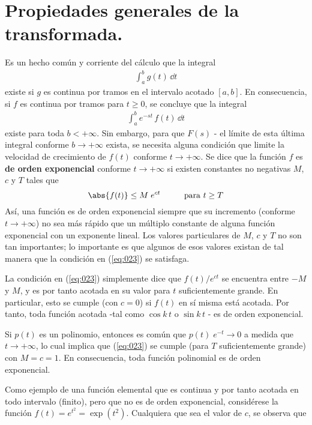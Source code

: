 \section{Propiedades generales de la transformada.}
Es un hecho común y corriente del cálculo que la integral
\begin{align*}
\int_{a}^{b} g(t) \, \dd{t}
\end{align*}
existe si $g$ es continua por tramos en el intervalo acotado $[a, b]$. En consecuencia, si $f$ es continua por tramos para $t \geq 0$, se concluye que la integral
\begin{align*}
\int_{a}^{b} e^{-st} \, f(t) \, \dd{t}
\end{align*}
existe para toda $b < + \infty$. Sin embargo, para que $F(s)$  - el límite de esta última integral conforme $b \to + \infty$ exista, se necesita alguna condición que limite la velocidad de crecimiento de $f(t)$ conforme $t \to + \infty$. Se dice que la función $f$ es \textbf{de orden exponencial} conforme $t \to + \infty$ si existen constantes no negativas $M$, $c$ y $T$ tales que
\begin{equation}
\abs{f(t)} \leq M \; e^{ct} \hspace{1cm} \mbox{para } t \geq T
\label{eq:023}
\end{equation}
Así, una función es de orden exponencial siempre que su incremento (conforme $t \to + \infty$) no sea más rápido que un múltiplo constante de alguna función exponencial con un exponente lineal. Los valores particulares de $M$, $c$ y $T$ no son tan importantes; lo importante es que algunos de esos valores existan de tal manera que la condición en (\ref{eq:023}) se satisfaga.
\par
La condición en (\ref{eq:023}) simplemente dice que $f(t) / e^{ct}$ se encuentra entre $-M$ y $M$, y es por tanto acotada en su valor para $t$ suficientemente grande. En particular, esto se cumple (con $c = 0$) si $f(t)$ en sí misma está acotada. Por tanto, toda función acotada -tal como $\cos k \, t$ o $\sin k \, t$ - es de orden exponencial.
\par
Si $p(t)$ es un polinomio, entonces es común que $p(t) \; e^{-t} \to 0$ a medida que $t \to +\infty$, lo cual implica que (\ref{eq:023}) se cumple (para $T$ suficientemente grande) con $M = c = 1$. En consecuencia, toda función polinomial es de orden exponencial.
\par
Como ejemplo de una función elemental que es continua y por tanto acotada en todo intervalo (finito), pero que no es de orden exponencial, considérese la función $f(t) = e^{t^{2}} = \exp(t^{2})$. Cualquiera que sea el valor de $c$, se observa que
